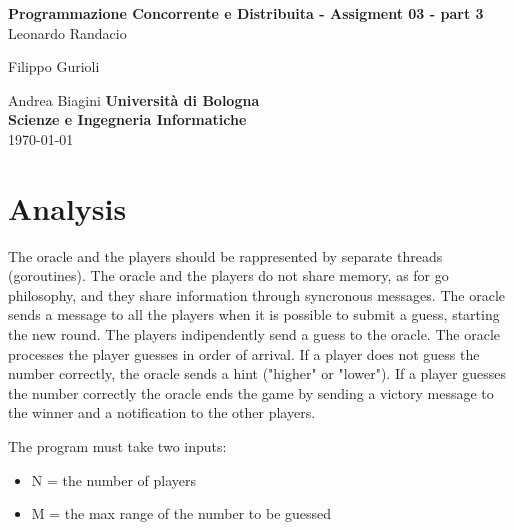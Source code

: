 \documentclass[12pt, a4paper]{report}
\begin{document}
\renewcommand\bibname{References} %


\begin{titlepage}

\begin{center}

\Large \textbf {Programmazione Concorrente e Distribuita - Assigment 03 - part 3}\\%
\vspace{1em}%
\vfill
Leonardo Randacio


Filippo Gurioli


Andrea Biagini
\vspace{1em}
\vfill
{\bf Università di Bologna \\ Scienze e Ingegneria Informatiche}\\[0.5in]

       
\vfill
\today

\end{center}

\end{titlepage}


\tableofcontents
\listoffigures
\listoftables

\newpage
{} %

\chapter{Analysis}
The oracle and the players should be rappresented by separate threads (goroutines). The oracle and the players do not share memory, as for go philosophy,
 and they share information through syncronous messages. The oracle sends a message to all the players when it is possible to submit a guess, starting the
 new round. The players indipendently send a guess to the oracle. The oracle processes the player guesses in order of arrival. If a player does not guess
 the number correctly, the oracle sends a hint ("higher" or "lower"). If a player guesses the number correctly the oracle ends the game by sending a victory
 message to the winner and a notification to the other players.

The program must take two inputs:
\begin{itemize}
    \item N = the number of players
    \item M = the max range of the number to be guessed
\end{itemize}
\end{document}
